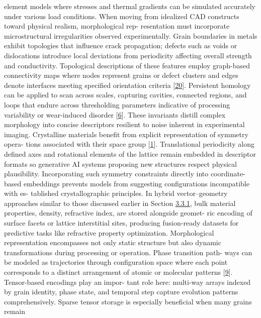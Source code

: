 \documentclass[
]{article}
\begin{document}
element models where stresses and thermal gradients can be simulated
accurately under various load conditions. When moving from idealized CAD
constructs toward physical realism, morphological rep- resentation must
incorporate microstructural irregularities observed experimentally.
Grain boundaries in metals exhibit topologies that influence crack
propagation; defects such as voids or dislocations introduce local
deviations from periodicity affecting overall strength and conductivity.
Topological descriptions of these features employ graph-based
connectivity maps where nodes represent grains or defect clusters and
edges denote interfaces meeting specified orientation criteria
{[}\protect\hyperlink{_bookmark60}{20}{]}. Persistent homology can be
applied to scan across scales, capturing cavities, connected regions,
and loops that endure across thresholding parameters indicative of
processing variability or wear-induced disorder
{[}\protect\hyperlink{_bookmark46}{6}{]}. These invariants distill
complex morphology into concise descriptors resilient to noise inherent
in experimental imaging. Crystalline materials benefit from explicit
representation of symmetry opera- tions associated with their space
group {[}\protect\hyperlink{_bookmark41}{1}{]}. Translational
periodicity along defined axes and rotational elements of the lattice
remain embedded in descriptor formats so generative AI systems proposing
new structures respect physical plausibility. Incorporating such
symmetry constraints directly into coordinate-based embeddings prevents
models from suggesting configurations incompatible with es- tablished
crystallographic principles. In hybrid vector--geometry approaches
similar to those discussed earlier in Section
\protect\hyperlink{combining-geometric-and-vector-representations}{3.3.1},
bulk material properties, density, refractive index, are stored
alongside geomet- ric encoding of surface facets or lattice interstitial
sites, producing fusion-ready datasets for predictive tasks like
refractive property optimization. Morphological representation
encompasses not only static structure but also dynamic transformations
during processing or operation. Phase transition path- ways can be
modeled as trajectories through configuration space where each point
corresponds to a distinct arrangement of atomic or molecular patterns
{[}\protect\hyperlink{_bookmark49}{9}{]}. Tensor-based encodings play an
impor- tant role here: multi-way arrays indexed by grain identity, phase
state, and temporal step capture evolution patterns comprehensively.
Sparse tensor storage is especially beneficial when many grains remain
\end{document}
